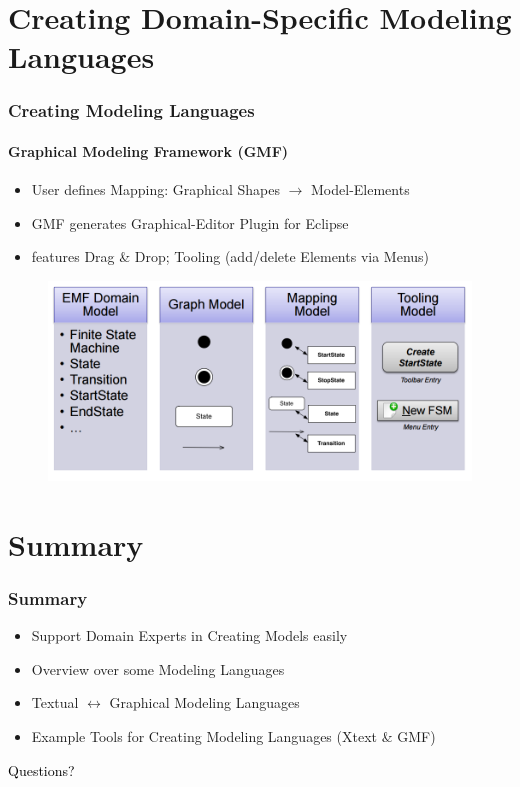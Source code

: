 \documentclass[11 pt,t]{beamer}
\begin{document}
\section{Creating Domain-Specific Modeling Languages}
\begin{frame}
\vspace{.5cm}
  \frametitle{Creating Modeling Languages}
  \framesubtitle{Graphical Modeling Framework (GMF)}
  \begin{itemize}
    \item User defines Mapping: Graphical Shapes $\rightarrow$ Model-Elements
    \item GMF generates Graphical-Editor Plugin for Eclipse 
    \item features Drag \& Drop; Tooling (add/delete Elements via Menus)
  \end{itemize}
  \begin{figure}[htbp]
      \centering
      \includegraphics[width=\textwidth]{images/TableGMFSteps.PNG}
      \label{mapmodel}
    \end{figure}
\end{frame}

\section{Summary}
\begin{frame}
  \vspace{2cm}
  \frametitle{Summary}
  \begin{itemize}
    \item Support Domain Experts in Creating Models easily 
    \item Overview over some Modeling Languages
    \item Textual $\leftrightarrow$ Graphical Modeling Languages
    \item Example Tools for Creating Modeling Languages (Xtext \& GMF)
  \end{itemize}
\end{frame}

\appendix
\begin{frame}
\vspace{4cm}
\centering \Large \textcolor{black}{Questions?}

\end{frame}
\end{document}
